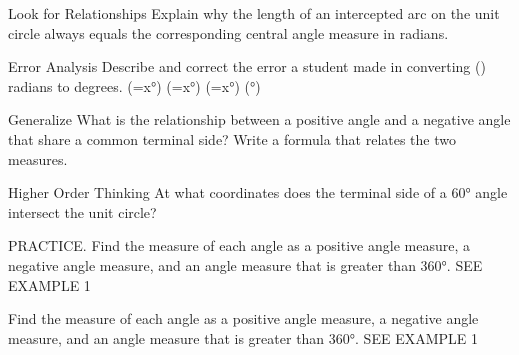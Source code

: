 \documentclass{article}
\newenvironment{practice}[2]{}{}        %
\newcommand{\answer}[1]{}               %
\newcommand{\placeholder}[2]{}          %
\newcommand{\te}[1]{}                   %
\begin{document}
\begin{practice}{17}{2}
Look for Relationships Explain why the length of an intercepted arc on the unit circle always equals the corresponding central angle measure in radians.
\answer{Since the radius of a unit circle is always 1, the angle measure in radians is equal to the length of the intercepted arc, divided by 1. Therefore, the angle measure in radians is always equal to the length of the intercepted arc.}
\end{practice}
\begin{practice}{18}{2}
Error Analysis Describe and correct the error a student made in converting (\frac{}) radians to degrees.
(\frac{}=x°)
(\frac{}\times\frac{}=x°)
(\frac{}=x°)
(°)
\te{Printed work appears on a note with a red X; the inconsistent fractions are reproduced literally.}
\answer{The student used the formula to solve for radians, not degrees: (\frac\pi2\times\frac{180}\pi=\frac{180\pi}{2\pi}=\frac{180}{2}=90°).}
\end{practice}
\begin{practice}{19}{2}
Generalize What is the relationship between a positive angle and a negative angle that share a common terminal side? Write a formula that relates the two measures.
\answer{The sum of the positive angle and the negative angle is a multiple of 360° or (2\pi); negative angle + positive angle (=k\cdot360°) or (2k\pi)}
\te{Printed sum and plus; likely difference and minus, since coterminal measures differ by an integer multiple of360° or2pi.}
\end{practice}
\begin{practice}{20}{2}
Higher Order Thinking At what coordinates does the terminal side of a 60° angle intersect the unit circle?
\placeholder{graph}{Red unit circle centered at origin on black arrowed x,y axes without ticks. Blue rays positive x and60° in I, red60° label.}
\answer{((\frac12,\frac{\sqrt3}{2}))}
\end{practice}
\begin{practice}{21}{1}
PRACTICE. Find the measure of each angle as a positive angle measure, a negative angle measure, and an angle measure that is greater than 360°. SEE EXAMPLE 1
\placeholder{graph}{Black arrowed x,y axes without ticks. Blue initial ray positive x; terminal ray II45° above negative x,45° red label and arc.}
\answer{135°, -225°, 495°}
\end{practice}
\begin{practice}{22}{1}
Find the measure of each angle as a positive angle measure, a negative angle measure, and an angle measure that is greater than 360°. SEE EXAMPLE 1
\placeholder{graph}{Black arrowed x,y axes without ticks. Blue initial ray positive x; terminal ray III60° below negative x,60° red label and arc.}
\answer{240°, -120°, 600°}
\end{practice}
\end{document}

